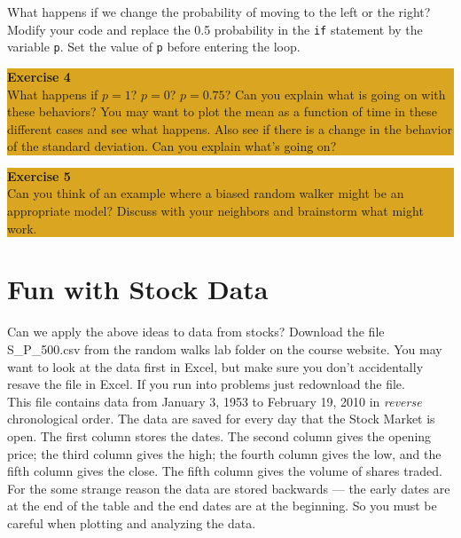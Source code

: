 \documentclass[12pt]{amsart}
\begin{document}
 What happens if we change the probability of moving to the left or the right?  Modify your code and replace the 0.5 probability in the \verb+if+ statement by the variable \verb+p+.  Set the value of \verb+p+ before entering the loop.
\bigskip
\begin{center}
\colorbox{Goldenrod}{\parbox{15cm}{
{
\textbf{\large Exercise 4}\vspace{1mm} \\
What happens if $p = 1$?  $p = 0$?  $p = 0.75$?  Can you explain what is going on with these behaviors?  You may want to plot the mean as a function of time in these different cases and see what happens.  Also see if there is a change in the behavior of the standard deviation.  Can you explain what's going on?
 }}}
 \end{center}
 \bigskip
 \begin{center}
 \colorbox{Goldenrod}{\parbox{15cm}{
{
\textbf{\large Exercise 5}\vspace{1mm} \\
Can you think of an example where a biased random walker might be an appropriate model?  Discuss with your neighbors and brainstorm what might work.
 }}}
  \end{center}

  \section{Fun with Stock Data}
 \noindent Can we apply the above ideas to data from stocks?  Download the file S\_P\_500.csv from the random walks lab folder on the course website.  You may want to look at the data first in Excel, but make sure you don't accidentally resave the file in Excel.  If you run into problems just redownload the file.\\
  
\noindent This file contains data from January 3, 1953 to February 19, 2010 in \textit{reverse} chronological order.  The data are saved for every day that the Stock Market is open.  The first column stores the dates.  The second column gives the opening price; the third column gives the high; the fourth column gives the low, and the fifth column gives the close.  The fifth column gives the volume of shares traded.  For the some strange reason the data are stored backwards --- the early dates are at the end of the table and the end dates are at the beginning.  So you must be careful when plotting and analyzing the data.\\
  
\end{document}
